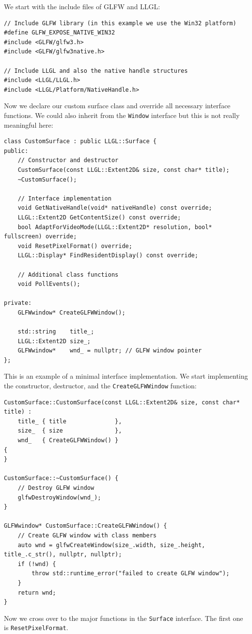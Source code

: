 \documentclass{article}
\begin{document}
We start with the include files of GLFW and LLGL:
\begin{lstlisting}
// Include GLFW library (in this example we use the Win32 platform)
#define GLFW_EXPOSE_NATIVE_WIN32
#include <GLFW/glfw3.h>
#include <GLFW/glfw3native.h>

// Include LLGL and also the native handle structures
#include <LLGL/LLGL.h>
#include <LLGL/Platform/NativeHandle.h>
\end{lstlisting}
Now we declare our custom surface class and override all necessary interface functions.
We could also inherit from the \texttt{Window} interface but this is not really meaningful here:
\begin{lstlisting}
class CustomSurface : public LLGL::Surface {
public:
	// Constructor and destructor
	CustomSurface(const LLGL::Extent2D& size, const char* title);
	~CustomSurface();
	
	// Interface implementation
	void GetNativeHandle(void* nativeHandle) const override;
	LLGL::Extent2D GetContentSize() const override;
	bool AdaptForVideoMode(LLGL::Extent2D* resolution, bool* fullscreen) override;
	void ResetPixelFormat() override;
	LLGL::Display* FindResidentDisplay() const override;
	
	// Additional class functions
	void PollEvents();
	
private:
	GLFWwindow* CreateGLFWWindow();
	
	std::string    title_;
	LLGL::Extent2D size_;
	GLFWwindow*    wnd_ = nullptr; // GLFW window pointer
};
\end{lstlisting}
This is an example of a minimal interface implementation.
We start implementing the constructor, destructor, and the \texttt{CreateGLFWWindow} function:
\begin{lstlisting}
CustomSurface::CustomSurface(const LLGL::Extent2D& size, const char* title) :
	title_ { title              },
	size_  { size               },
	wnd_   { CreateGLFWWindow() }
{
}

CustomSurface::~CustomSurface() {
	// Destroy GLFW window
	glfwDestroyWindow(wnd_);
}

GLFWwindow* CustomSurface::CreateGLFWWindow() {
	// Create GLFW window with class members
	auto wnd = glfwCreateWindow(size_.width, size_.height, title_.c_str(), nullptr, nullptr);
	if (!wnd) {
		throw std::runtime_error("failed to create GLFW window");
	}
	return wnd;
}
\end{lstlisting}
Now we cross over to the major functions in the \texttt{Surface} interface. The first one is \texttt{ResetPixelFormat}.
\end{document}

